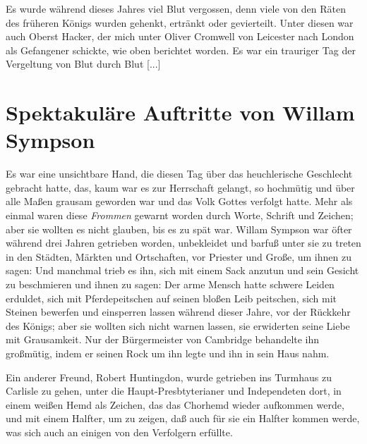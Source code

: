 Es wurde während dieses Jahres viel Blut vergossen, denn
viele von den Räten des früheren Königs wurden gehenkt, ertränkt
oder gevierteilt. Unter diesen war auch Oberst 
Hacker, der mich
unter Oliver Cromwell von 
Leicester nach London als Gefangener
schickte, wie oben berichtet worden. Es war ein trauriger Tag
der Vergeltung von Blut durch Blut [...]

\section{Spektakuläre Auftritte von Willam Sympson}

Es war eine unsichtbare Hand, die diesen Tag über das
heuchlerische Geschlecht gebracht hatte, das, kaum war es zur
Herrschaft gelangt, so hochmütig und über alle Maßen grausam
geworden war und das Volk Gottes verfolgt hatte.
Mehr als einmal waren diese \textit{Frommen} gewarnt worden
durch Worte, Schrift und Zeichen; aber sie wollten es nicht
glauben, bis es zu spät war.  
 
Willam Sympson war öfter während
drei Jahren getrieben worden, unbekleidet und barfuß unter sie
zu treten in den Städten, Märkten und Ortschaften, vor Priester
und Große, um ihnen zu sagen:  Und manchmal trieb es ihn, sich mit einem Sack
anzutun und sein Gesicht zu beschmieren und ihnen zu sagen:
 Der arme Mensch hatte schwere Leiden erduldet,
sich mit Pferdepeitschen auf seinen bloßen Leib peitschen, sich mit
Steinen bewerfen und einsperren lassen während dieser Jahre, vor
der Rückkehr des Königs; aber sie wollten sich nicht warnen
lassen, sie erwiderten seine Liebe mit Grausamkeit. Nur der
Bürgermeister von Cambridge behandelte ihn großmütig, indem
er seinen Rock um ihn legte und ihn in sein Haus nahm.

Ein anderer Freund, Robert Huntingdon, 
wurde getrieben ins Turmhaus zu Carlisle zu gehen, unter die 
Haupt-Presbtyterianer
und Independeten dort, in einem weißen Hemd als
Zeichen, das das Chorhemd wieder aufkommen werde, und mit
einem Halfter, um zu zeigen, daß auch für sie ein Halfter kommen
werde, was sich auch an einigen von den Verfolgern erfüllte.


